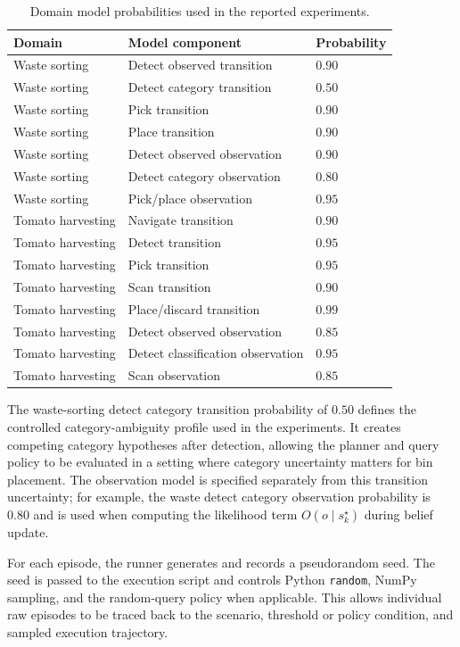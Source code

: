 \begin{table}[h]
\centering
\caption{Domain model probabilities used in the reported experiments.}
\label{tab:app_model_params}
\small
\begin{tabular}{lll}
\toprule
\textbf{Domain} & \textbf{Model component} & \textbf{Probability} \\
\midrule
Waste sorting & Detect observed transition & $0.90$ \\
Waste sorting & Detect category transition & $0.50$ \\
Waste sorting & Pick transition & $0.90$ \\
Waste sorting & Place transition & $0.90$ \\
Waste sorting & Detect observed observation & $0.90$ \\
Waste sorting & Detect category observation & $0.80$ \\
Waste sorting & Pick/place observation & $0.95$ \\
\midrule
Tomato harvesting & Navigate transition & $0.90$ \\
Tomato harvesting & Detect transition & $0.95$ \\
Tomato harvesting & Pick transition & $0.95$ \\
Tomato harvesting & Scan transition & $0.90$ \\
Tomato harvesting & Place/discard transition & $0.99$ \\
Tomato harvesting & Detect observed observation & $0.85$ \\
Tomato harvesting & Detect classification observation & $0.95$ \\
Tomato harvesting & Scan observation & $0.85$ \\
\bottomrule
\end{tabular}
\end{table}

The waste-sorting detect category transition probability of $0.50$ defines the controlled category-ambiguity profile used in the experiments. It creates competing category hypotheses after detection, allowing the planner and query policy to be evaluated in a setting where category uncertainty matters for bin placement. The observation model is specified separately from this transition uncertainty; for example, the waste detect category observation probability is $0.80$ and is used when computing the likelihood term $O(o \mid s_k^{\star})$ during belief update.

For each episode, the runner generates and records a pseudorandom seed. The seed is passed to the execution script and controls Python \texttt{random}, NumPy sampling, and the random-query policy when applicable. This allows individual raw episodes to be traced back to the scenario, threshold or policy condition, and sampled execution trajectory.
